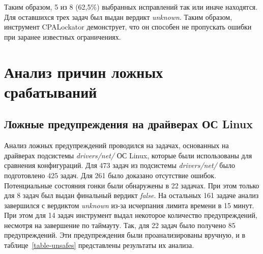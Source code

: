 
Таким образом, 5 из 8 (62,5\%) выбранных исправлений так или иначе находятся.
Для оставшихся трех задач был выдан вердикт \textit{unknown}.
Таким образом, инструмент CPALockator демонструет, что он способен не пропускать ошибки при заранее известных ограничениях.

\section{Анализ причин ложных срабатываний}

\subsection{Ложные предупреждения на драйверах ОС Linux}

Анализ ложных предупреждений проводился на задачах, основанных на драйверах подсистемы \textit{drivers/net/} ОС Linux, которые были использованы для сравнения конфигураций.
Для 473 задач из подсистемы \textit{drivers/net/} было подготовлено 425 задач.
Для 261 было доказано отсутствие ошибок.
Потенциальные состояния гонки были обнаружены в 22 задачах.
При этом только для 8 задач был выдан финальный вердикт \textit{false}.
На остальных 161 задаче анализ завершился с вердиктом \textit{unknown} из-за исчерпания лимита времени в 15 минут.
При этом для 14 задач инструмент выдал некоторое количество предупреждений, несмотря на завершение по таймауту.
Так, для 22 задач было получено 85 предупреждений. 
Эти предупреждения были проанализированы вручную, и в таблице~\ref{table-unsafes} представлены результаты их анализа.

